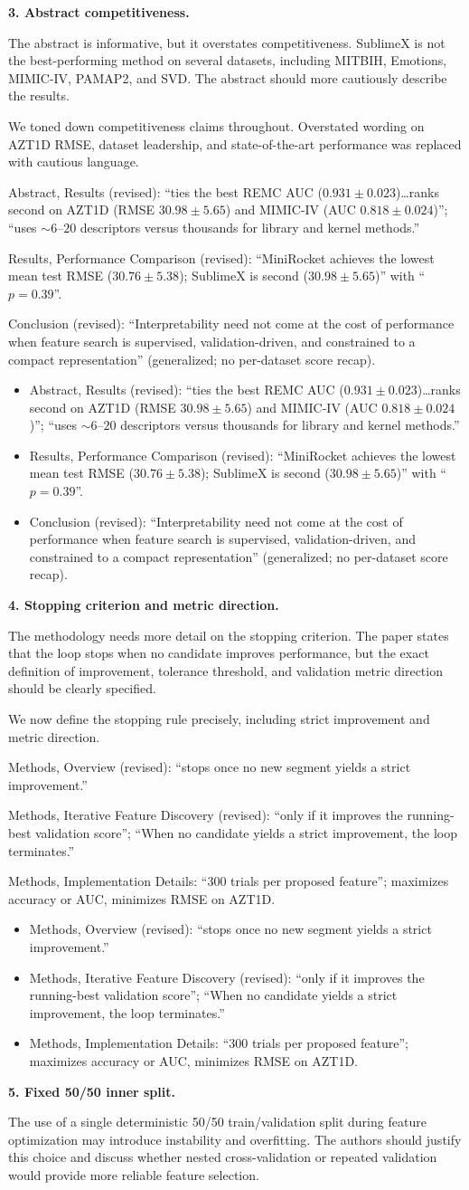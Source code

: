 \documentclass[11pt]{article}
\makeatletter
\newcommand{\rsp}{\par\vspace{0.9em}}
\newcommand{\rcitem}[2]{\begin{reviewerbox}\textbf{#1}\par\smallskip#2\end{reviewerbox}}
\newcommand{\response}[2]{%
  \begin{responsebox}#1%
  \def\@responseitems{#2}%
  \ifx\@responseitems\empty\else\begin{itemize}[nosep,leftmargin=1.2em]#2\end{itemize}\fi
  \end{responsebox}\rsp}
\makeatother
\begin{document}
\rcitem{3. Abstract competitiveness.}{The abstract is informative, but it overstates
competitiveness. SublimeX is not the best-performing method on several datasets, including MITBIH,
Emotions, MIMIC-IV, PAMAP2, and SVD. The abstract should more cautiously describe the results.}

\response{We toned down competitiveness claims throughout. Overstated wording on AZT1D RMSE,
dataset leadership, and state-of-the-art performance was replaced with cautious language.}{
  \item Abstract, Results (revised): ``ties the best REMC AUC ($0.931 \pm 0.023$)\ldots ranks
    second on AZT1D (RMSE $30.98 \pm 5.65$) and MIMIC-IV (AUC $0.818 \pm 0.024$)''; ``uses
    ${\sim}6$--$20$ descriptors versus thousands for library and kernel methods.''
  \item Results, Performance Comparison (revised): ``MiniRocket achieves the lowest mean test RMSE
    ($30.76{\pm}5.38$); SublimeX is second ($30.98{\pm}5.65$)'' with ``$p{=}0.39$''.
  \item Conclusion (revised): ``Interpretability need not come at the cost of performance when
    feature search is supervised, validation-driven, and constrained to a compact representation''
    (generalized; no per-dataset score recap).
}

\rcitem{4. Stopping criterion and metric direction.}{The methodology needs more detail on the
stopping criterion. The paper states that the loop stops when no candidate improves performance,
but the exact definition of improvement, tolerance threshold, and validation metric direction
should be clearly specified.}

\response{We now define the stopping rule precisely, including strict improvement and metric
direction.}{
  \item Methods, Overview (revised): ``stops once no new segment yields a strict improvement.''
  \item Methods, Iterative Feature Discovery (revised): ``only if it improves the running-best
    validation score''; ``When no candidate yields a strict improvement, the loop terminates.''
  \item Methods, Implementation Details: ``300 trials per proposed feature''; maximizes accuracy or
    AUC, minimizes RMSE on AZT1D.
}

\rcitem{5. Fixed 50/50 inner split.}{The use of a single deterministic 50/50 train/validation
split during feature optimization may introduce instability and overfitting. The authors should
justify this choice and discuss whether nested cross-validation or repeated validation would
provide more reliable feature selection.}
\end{document}
